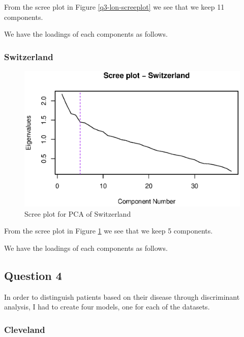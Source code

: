 \documentclass[a4paper]{article}
\begin{document}
From the scree plot in Figure \ref{q3-lon-screeplot} we see that we keep 11 components.

We have the loadings of each components as follows.



\subsubsection{Switzerland}

\begin{figure}[H]
	\begin{center}
		\includegraphics[width=12cm]{question3output/swiscreeplot.eps}
	\end{center}
	\caption{Scree plot for PCA of Switzerland}
	\label{q3-swi-screeplot}
\end{figure}

From the scree plot in Figure \ref{q3-swi-screeplot} we see that we keep 5 components.

We have the loadings of each components as follows.



\newpage
\subsection{Question 4}

In order to distinguish patients based on their disease through discriminant
analysis, I had to create four models, one for each of the datasets.

\subsubsection{Cleveland}
\end{document}
